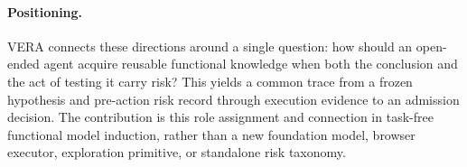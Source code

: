 \paragraph{Positioning.}
VERA connects these directions around a single question: how should an
open-ended agent acquire reusable functional knowledge when both the conclusion
and the act of testing it carry risk? This yields a common trace from a frozen
hypothesis and pre-action risk record through execution evidence to an
admission decision. The contribution is this role assignment and connection in
task-free functional model induction, rather than a new foundation model,
browser executor, exploration primitive, or standalone risk taxonomy.

